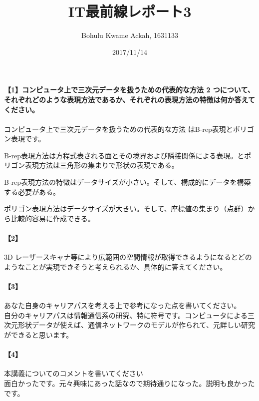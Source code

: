 \documentclass[20 pts]{article}
\title{IT最前線レポート3}
\author{Bohulu Kwame Ackah, 1631133}
\date{2017/11/14}
\begin{document}
\maketitle

\newpage
\paragraph{【1】コンピュータ上で三次元データを扱うための代表的な方法 2 つについて、それぞれどのような表現方法であるか、それぞれの表現方法の特徴は何か答えてください。}
\paragraph{}
コンピュータ上で三次元データを扱うための代表的な方法 はB-rep表現とポリゴン表現です。

B-rep表現方法は方程式表される面とその境界および隣接関係による表現。とポリゴン表現方法は三角形の集まりで形状の表現である。

B-rep表現方法の特徴はデータサイズが小さい。そして、構成的にデータを構築する必要がある。

ポリゴン表現方法はデータサイズが大きい。そして、座標値の集まり（点群）から比較的容易に作成できる。

\paragraph{【2】}3D レーザースキャナ等により広範囲の空間情報が取得できるようになるとどのようなことが実現できそうと考えられるか、具体的に答えてください。\\





\newpage
\paragraph{【3】}あなた自身のキャリアパスを考える上で参考になった点を書いてください。\\
自分のキャリアパスは情報通信系の研究、特に符号です。コンピュータによる三次元形状データが使えば、通信ネットワークのモデルが作られて、元詳しい研究
ができると思います。


\paragraph{【4】}本講義についてのコメントを書いてください\\
面白かったです。元々興味にあった話なので期待通りになった。説明も良かったです。
\end{document}
